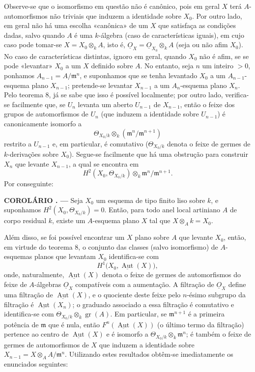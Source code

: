 \documentclass[11pt,twoside,openany]{book}
\numberwithin{equation}{section}
\newcommand{\Osh}{\underline{O}}
\theoremstyle{plain}
\theoremstyle{definition}
\theoremstyle{remark}
\newcommand{\result}[2]{%
  \par\medskip\noindent\textbf{#1%
  \if\relax\detokenize{#2}\relax\else\space#2\fi. ---}\enspace
}
\begin{document}
Observe-se que o isomorfismo em questão não é canônico, pois em geral $X$
terá $A$-automorfismos não triviais que induzem a identidade sobre $X_0$. Por
outro lado, em geral não há uma escolha «canônica» de um $X$ que satisfaça
as condições dadas, salvo quando $A$ é uma $k$-álgebra (caso de
características iguais), em cujo caso pode tomar-se $X=X_0\otimes_k A$, isto
é, $\Osh_X=\Osh_{X_0}\otimes_k A$ (seja ou não afim $X_0$). No caso de
características distintas, ignoro em geral, quando $X_0$ não é afim, se se
pode «levantar» $X_0$ a um $X$ definido sobre $A$. No entanto, seja $n$ um
inteiro $>0$, ponhamos $A_{n-1}=A/\mathfrak m^n$, e suponhamos que se tenha
levantado $X_0$ a um $A_{n-1}$-esquema plano $X_{n-1}$; pretende-se levantar
$X_{n-1}$ a um $A_n$-esquema plano $X_n$. Pelo teorema 8, já se sabe que isso
é possível localmente; por outro lado, verifica-se facilmente que, se $U_n$
levanta um aberto $U_{n-1}$ de $X_{n-1}$, então o feixe dos grupos de
automorfismos de $U_n$ (que induzem a identidade sobre $U_{n-1}$) é
canonicamente isomorfo a
\[
  \Theta_{X_0/k}\otimes_k(\mathfrak m^n/\mathfrak m^{n+1})
\]
restrito a $U_{n-1}$ e, em particular, é comutativo
($\Theta_{X_0/k}$ denota o feixe de germes de $k$-derivações sobre $X_0$).
Segue-se facilmente que há uma obstrução para construir $X_n$ que levante
$X_{n-1}$, a qual se encontra em
\[
  H^2(X_0,\Theta_{X_0/k})\otimes_k
  \mathfrak m^n/\mathfrak m^{n+1}.
\]
Por conseguinte:

\result{COROLÁRIO}{1} Seja $X_0$ um esquema de tipo finito liso sobre $k$, e
suponhamos $H^2(X_0,\Theta_{X_0/k})=0$. Então, para todo anel local
artiniano $A$ de corpo residual $k$, existe um $A$-esquema plano $X$ tal que
$X\otimes_A k=X_0$.

Além disso, se foi possível encontrar um $X$ plano sobre $A$ que levante $X_0$,
então, em virtude do teorema 8, o conjunto das classes (salvo isomorfismo)
de $A$-esquemas planos que levantam $X_0$ identifica-se com
\[
  H^1\bigl(X_0,\underline{\operatorname{Aut}}(X)\bigr),
\]
onde, naturalmente, $\underline{\operatorname{Aut}}(X)$ denota o feixe de
germes de automorfismos do feixe de $A$-álgebras $\Osh_X$ compatíveis com a
aumentação. A filtração de $\Osh_X$ define uma filtração de
$\underline{\operatorname{Aut}}(X)$, e o quociente deste feixe pelo $n$-ésimo
subgrupo da filtração é $\underline{\operatorname{Aut}}(X_n)$; o graduado
associado a essa filtração é comutativo e identifica-se com
$\Theta_{X_0/k}\otimes_k\operatorname{gr}(A)$. Em particular, se
$\mathfrak m^{n+1}$ é a primeira potência de $\mathfrak m$ que é nula,
então $F^n(\underline{\operatorname{Aut}}(X))$ (o último termo da
filtração) pertence ao centro de $\underline{\operatorname{Aut}}(X)$ e é
isomorfo a $\Theta_{X_0/k}\otimes_k\mathfrak m^n$; é também o feixe de
germes de automorfismos de $X$ que induzem a identidade sobre
$X_{n-1}=X\otimes_A A/\mathfrak m^n$. Utilizando estes resultados obtêm-se
imediatamente os enunciados seguintes:
\end{document}
